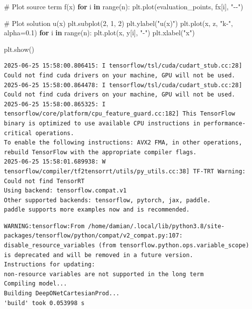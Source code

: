 \documentclass[
  spanish,
  us-letterpaper,
  DIV=11,
  numbers=noendperiod]{scrreprt}
\newenvironment{Shaded}{\begin{snugshade}}{\end{snugshade}}
\newcommand{\BuiltInTok}[1]{\textcolor[rgb]{0.00,0.23,0.31}{#1}}
\newcommand{\CommentTok}[1]{\textcolor[rgb]{0.37,0.37,0.37}{#1}}
\newcommand{\ControlFlowTok}[1]{\textcolor[rgb]{0.00,0.23,0.31}{\textbf{#1}}}
\newcommand{\DecValTok}[1]{\textcolor[rgb]{0.68,0.00,0.00}{#1}}
\newcommand{\FloatTok}[1]{\textcolor[rgb]{0.68,0.00,0.00}{#1}}
\newcommand{\KeywordTok}[1]{\textcolor[rgb]{0.00,0.23,0.31}{\textbf{#1}}}
\newcommand{\NormalTok}[1]{\textcolor[rgb]{0.00,0.23,0.31}{#1}}
\newcommand{\OperatorTok}[1]{\textcolor[rgb]{0.37,0.37,0.37}{#1}}
\newcommand{\StringTok}[1]{\textcolor[rgb]{0.13,0.47,0.30}{#1}}
\theoremstyle{plain}
\theoremstyle{definition}
\theoremstyle{remark}
\begin{document}
\begin{Shaded}
\begin{Highlighting}[]
\CommentTok{\# Plot source term f(x)}
\ControlFlowTok{for}\NormalTok{ i }\KeywordTok{in} \BuiltInTok{range}\NormalTok{(n):}
\NormalTok{    plt.plot(evaluation\_points, fx[i], }\StringTok{"{-}{-}"}\NormalTok{)}

\CommentTok{\# Plot solution u(x)}
\NormalTok{plt.subplot(}\DecValTok{2}\NormalTok{, }\DecValTok{1}\NormalTok{, }\DecValTok{2}\NormalTok{)}
\NormalTok{plt.ylabel(}\StringTok{"u(x)"}\NormalTok{)}
\NormalTok{plt.plot(x, z, }\StringTok{"k{-}"}\NormalTok{, alpha}\OperatorTok{=}\FloatTok{0.1}\NormalTok{)}
\ControlFlowTok{for}\NormalTok{ i }\KeywordTok{in} \BuiltInTok{range}\NormalTok{(n):}
\NormalTok{    plt.plot(x, y[i], }\StringTok{"{-}"}\NormalTok{)}
\NormalTok{plt.xlabel(}\StringTok{"x"}\NormalTok{)}

\NormalTok{plt.show()}
\end{Highlighting}
\end{Shaded}

\begin{verbatim}
2025-06-25 15:58:00.806415: I tensorflow/tsl/cuda/cudart_stub.cc:28] Could not find cuda drivers on your machine, GPU will not be used.
2025-06-25 15:58:00.864478: I tensorflow/tsl/cuda/cudart_stub.cc:28] Could not find cuda drivers on your machine, GPU will not be used.
2025-06-25 15:58:00.865325: I tensorflow/core/platform/cpu_feature_guard.cc:182] This TensorFlow binary is optimized to use available CPU instructions in performance-critical operations.
To enable the following instructions: AVX2 FMA, in other operations, rebuild TensorFlow with the appropriate compiler flags.
2025-06-25 15:58:01.689938: W tensorflow/compiler/tf2tensorrt/utils/py_utils.cc:38] TF-TRT Warning: Could not find TensorRT
Using backend: tensorflow.compat.v1
Other supported backends: tensorflow, pytorch, jax, paddle.
paddle supports more examples now and is recommended.
\end{verbatim}

\begin{verbatim}
WARNING:tensorflow:From /home/damian/.local/lib/python3.8/site-packages/tensorflow/python/compat/v2_compat.py:107: disable_resource_variables (from tensorflow.python.ops.variable_scope) is deprecated and will be removed in a future version.
Instructions for updating:
non-resource variables are not supported in the long term
Compiling model...
Building DeepONetCartesianProd...
'build' took 0.053998 s
\end{verbatim}
\end{document}

